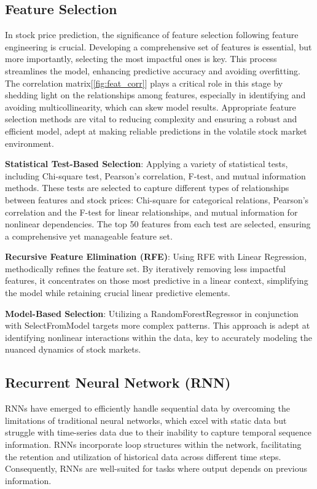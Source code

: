\documentclass[10pt,twocolumn,letterpaper]{article}
\begin{document}
\subsection{Feature Selection}
\label{sec:fs}
In stock price prediction, the significance of feature selection following feature engineering is crucial.
Developing a comprehensive set of features is essential, but more importantly, selecting the most impactful ones is key.
This process streamlines the model, enhancing predictive accuracy and avoiding overfitting.
The correlation matrix[\ref{fig:feat_corr}] plays a critical role in this stage by shedding light on the relationships among features, especially in identifying and avoiding multicollinearity, which can skew model results.
Appropriate feature selection methods are vital to reducing complexity and ensuring a robust and efficient model, adept at making reliable predictions in the volatile stock market environment.

\textbf{Statistical Test-Based Selection}: Applying a variety of statistical tests, including Chi-square test, Pearson's correlation, F-test, and mutual information methods.
These tests are selected to capture different types of relationships between features and stock prices: Chi-square for categorical relations, Pearson's correlation and the F-test for linear relationships, and mutual information for nonlinear dependencies\cite{pedregosa2011scikit}.
The top 50 features from each test are selected, ensuring a comprehensive yet manageable feature set.

\textbf{Recursive Feature Elimination (RFE)}: Using RFE with Linear Regression, methodically refines the feature set.
By iteratively removing less impactful features, it concentrates on those most predictive in a linear context, simplifying the model while retaining crucial linear predictive elements\cite{pedregosa2011scikit}.

\textbf{Model-Based Selection}: Utilizing a RandomForestRegressor in conjunction with SelectFromModel targets more complex patterns.
This approach is adept at identifying nonlinear interactions within the data, key to accurately modeling the nuanced dynamics of stock markets.

\subsection{Recurrent Neural Network (RNN)}
\label{sec:rnns}
RNNs have emerged to efficiently handle sequential data by overcoming the limitations of traditional neural networks, which excel with static data but struggle with time-series data due to their inability to capture temporal sequence information\cite{rumelhart1986learning}.
RNNs incorporate loop structures within the network, facilitating the retention and utilization of historical data across different time steps. Consequently, RNNs are well-suited for tasks where output depends on previous information.
\end{document}

